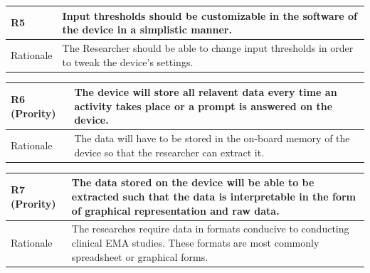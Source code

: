 \documentclass[12pt]{article}
\begin{document}
\hspace{0.5em}
\begin{center}
\begin{tabular}{|l|p{14cm}|}
 \hline
 R5 \label{R5} &Input thresholds should be customizable in the software of the device in a simplistic manner.\\ [0.5ex]
 \hline
 Rationale & The Researcher should be able to change input thresholds in order to tweak the device's settings.\\ 
 \hline
\end{tabular}
\end{center}
\hspace{0.5em}
\begin{center}
\begin{tabular}{|l|p{14cm}|}
 \hline
 R6 \label{R6} (Prority) &The device will store all relavent data every time an activity takes place or a prompt is answered on the device.\\ [0.5ex]
 \hline
 Rationale & The data will have to be stored in the on-board memory of the device so that the researcher can extract it.\\ 
 \hline
\end{tabular}
\end{center}
\hspace{0.5em}
\begin{center}
\begin{tabular}{|l|p{14cm}|}
 \hline
 R7 \label{R7} (Prority) &The data stored on the device will be able to be extracted such that the data is interpretable in the form of graphical representation and raw data.\\[0.5ex]
 \hline
 Rationale & The researches require data in formats conducive to conducting clinical EMA studies. These formats are most commonly spreadsheet or graphical forms.\\ 
 \hline
\end{tabular}
\end{center}
\end{document}
